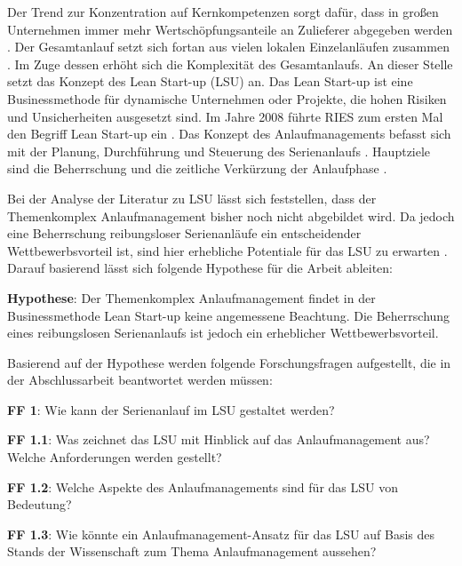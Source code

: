 \documentclass[%
a4paper,
aps,
pra,
 longbibliography,
 lengthcheck,%
]{revtex4-1}
\begin{document}
Der Trend zur Konzentration auf Kernkompetenzen sorgt dafür, dass in großen Unternehmen immer mehr Wertschöpfungsanteile an Zulieferer abgegeben werden  \cite{Hilmola2015, Wildemann2008}. Der Gesamtanlauf setzt sich fortan aus vielen lokalen Einzelanläufen zusammen \cite{Zimolong2006}. Im Zuge dessen erhöht sich die Komplexität des Gesamtanlaufs. An dieser Stelle setzt das Konzept des Lean Start-up (LSU) an. Das Lean Start-up ist eine Businessmethode für dynamische Unternehmen oder Projekte, die hohen Risiken und Unsicherheiten ausgesetzt sind. %
Im Jahre 2008 führte RIES zum ersten Mal den Begriff Lean Start-up ein \cite{Ries2008}. 
Das Konzept des Anlaufmanagements befasst sich mit der Planung, Durchführung und Steuerung des Serienanlaufs \cite[8]{Kuhn2002}. Hauptziele sind die Beherrschung und die zeitliche Verkürzung der Anlaufphase \cite{Kuhn2002, Schmitt2015}.

Bei der Analyse der Literatur zu LSU lässt sich feststellen, dass der Themenkomplex Anlaufmanagement bisher noch nicht abgebildet wird. Da jedoch eine Beherrschung reibungsloser Serienanläufe ein entscheidender Wettbewerbsvorteil ist, sind hier erhebliche Potentiale für das LSU zu erwarten \cite[XI]{Bischoff2007}. Darauf basierend lässt sich folgende Hypothese für die Arbeit ableiten: 

\textbf{Hypothese}: Der Themenkomplex Anlaufmanagement findet in der Businessmethode Lean Start-up keine angemessene Beachtung. Die Beherrschung eines reibungslosen Serienanlaufs ist jedoch ein erheblicher Wettbewerbsvorteil. 

Basierend auf der Hypothese werden folgende Forschungsfragen aufgestellt, die in der Abschlussarbeit beantwortet werden müssen: 

\textbf{FF 1}: Wie kann der Serienanlauf im LSU gestaltet werden? 

\textbf{FF 1.1}: Was zeichnet das LSU mit Hinblick auf das Anlaufmanagement aus? Welche Anforderungen werden gestellt?

\textbf{FF 1.2}: Welche Aspekte des Anlaufmanagements sind für das LSU von Bedeutung? 

\textbf{FF 1.3}: Wie könnte ein Anlaufmanagement-Ansatz für das LSU auf Basis des Stands der Wissenschaft zum Thema Anlaufmanagement aussehen?  
\end{document}
